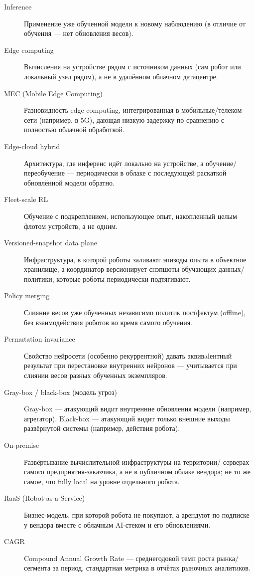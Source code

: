 \documentclass[11pt]{article}
\begin{document}
\begin{description}
  \item[Inference] Применение уже обученной модели к новому наблюдению (в отличие от
    обучения — нет обновления весов).
  \item[Edge computing] Вычисления на устройстве рядом с источником данных (сам робот
    или локальный узел рядом), а не в удалённом облачном датацентре.
  \item[MEC (Mobile Edge Computing)] Разновидность edge computing, интегрированная в
    мобильные/телеком-сети (например, в 5G), дающая низкую задержку по сравнению с
    полностью облачной обработкой.
  \item[Edge-cloud hybrid] Архитектура, где инференс идёт локально на устройстве, а
    обучение/переобучение — периодически в облаке с последующей раскаткой обновлённой
    модели обратно.
  \item[Fleet-scale RL] Обучение с подкреплением, использующее опыт, накопленный
    целым флотом устройств, а не одним.
  \item[Versioned-snapshot data plane] Инфраструктура, в которой роботы заливают
    эпизоды опыта в объектное хранилище, а координатор версионирует снэпшоты
    обучающих данных/политики, которые роботы периодически подтягивают.
  \item[Policy merging] Слияние весов уже обученных независимо политик постфактум
    (offline), без взаимодействия роботов во время самого обучения.
  \item[Permutation invariance] Свойство нейросети (особенно рекуррентной) давать
    эквивalентный результат при перестановке внутренних нейронов — учитывается при
    слиянии весов разных обученных экземпляров.
  \item[Gray-box / black-box (модель угроз)] Gray-box — атакующий видит внутренние
    обновления модели (например, агрегатор). Black-box — атакующий видит только
    внешние выходы развёрнутой системы (например, действия робота).
  \item[On-premise] Развёртывание вычислительной инфраструктуры на территории/
    серверах самого предприятия-заказчика, а не в публичном облаке вендора; не то же
    самое, что \guillemotleft fully local\guillemotright{} на уровне отдельного
    робота.
  \item[RaaS (Robot-as-a-Service)] Бизнес-модель, при которой робота не покупают, а
    арендуют по подписке у вендора вместе с облачным AI-стеком и его обновлениями.
  \item[CAGR] Compound Annual Growth Rate — среднегодовой темп роста рынка/сегмента
    за период, стандартная метрика в отчётах рыночных аналитиков.
\end{description}
\end{document}
